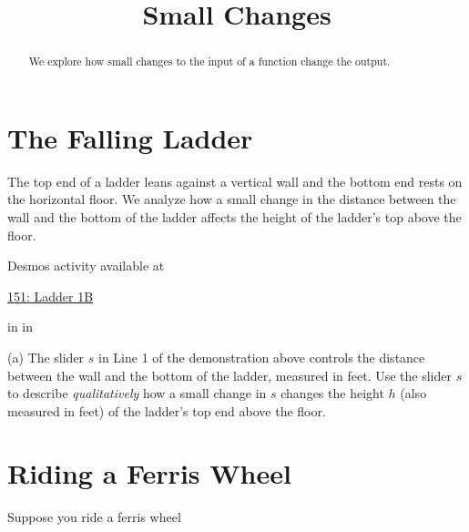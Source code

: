 \documentclass{ximera}
\title{Small Changes}
\newcommand{\pskip}{\vskip 0.1 in}
\begin{document}
\begin{abstract}
We explore how small changes to the input of a function change the output.
\end{abstract}
\maketitle


\section{The Falling Ladder}


\begin{example}   \label{Ex435rsfeetr}

The top end of a ladder leans against a vertical wall and the bottom end rests on the horizontal floor. We analyze how a small change in the distance between the wall and the bottom of the ladder affects the height of the ladder's top above the floor. 

 
\begin{onlineOnly}
    \begin{center}
\end{center}
\end{onlineOnly}

Desmos activity available at

\href{https://www.desmos.com/calculator/mehya355rr}{151: Ladder 1B}

\pskip \pskip

\begin{question}  \label{Qdsfesarr4}

(a) The slider $s$ in Line 1 of the demonstration above controls the distance between the wall and the bottom of the ladder, measured in feet. Use the slider $s$ to describe \emph{qualitatively} how a small change in $s$ changes the height $h$ (also measured in feet) of the ladder's top end above the floor.


\end{question}


\end{example}


\section{Riding a Ferris Wheel}


Suppose  you ride a ferris wheel
\end{document}
